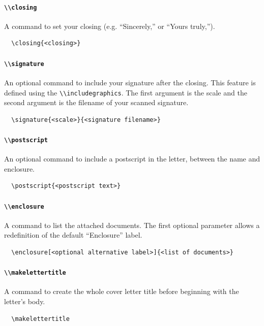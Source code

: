 \documentclass[a4paper, 11pt]{article}
\newcommand{\code}[1]{\lstinline!#1!}
\begin{document}
\paragraph{\code{\\closing}}
A command to set your closing (e.g. ``Sincerely,'' or ``Yours truly,'').
\begin{lstlisting}
  \closing{<closing>}
\end{lstlisting}

\paragraph{\code{\\signature}}
An optional command to include your signature after the closing. This feature is defined using the \code{\\includegraphics}. The first argument is the scale and the second argument is the filename of your scanned signature.
\begin{lstlisting}
  \signature{<scale>}{<signature filename>}
\end{lstlisting}

\paragraph{\code{\\postscript}}
An optional command to include a postscript in the letter, between the name and enclosure.
\begin{lstlisting}
  \postscript{<postscript text>}
\end{lstlisting}

\paragraph{\code{\\enclosure}}
A command to list the attached documents. The first optional parameter allows a redefinition of the default ``Enclosure'' label.
\begin{lstlisting}
  \enclosure[<optional alternative label>]{<list of documents>}
\end{lstlisting}

\paragraph{\code{\\makelettertitle}}
A command to create the whole cover letter title before beginning with the letter's body.
\begin{lstlisting}
  \makelettertitle
\end{lstlisting}
\end{document}
